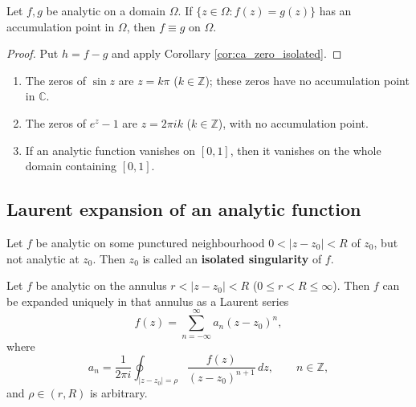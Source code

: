 \begin{corollary}\label{cor:ca_identity_theorem}
Let $f, g$ be analytic on a domain $\Omega$. If $\{z \in \Omega : f(z) = g(z)\}$ has an accumulation point in $\Omega$, then $f \equiv g$ on $\Omega$.
\end{corollary}

\begin{proof}
Put $h = f - g$ and apply Corollary \ref{cor:ca_zero_isolated}.
\end{proof}

\begin{example}\label{ex:ca_zero_isolated_application}
\begin{enumerate}[label=(\roman*)]
    \item The zeros of $\sin z$ are $z = k\pi$ ($k \in \mathbb{Z}$); these zeros have no accumulation point in $\mathbb{C}$.
    \item The zeros of $e^z - 1$ are $z = 2\pi i k$ ($k \in \mathbb{Z}$), with no accumulation point.
    \item If an analytic function vanishes on $[0, 1]$, then it vanishes on the whole domain containing $[0, 1]$.
\end{enumerate}
\end{example}

\subsection{Laurent expansion of an analytic function}

\begin{definition}\label{def:ca_isolated_singularity}
Let $f$ be analytic on some punctured neighbourhood $0 < |z - z_0| < R$ of $z_0$, but not analytic at $z_0$. Then $z_0$ is called an \textbf{isolated singularity} of $f$.
\end{definition}

\begin{theorem}\label{thm:ca_laurent_expansion}
Let $f$ be analytic on the annulus $r < |z - z_0| < R$ ($0 \le r < R \le \infty$). Then $f$ can be expanded uniquely in that annulus as a Laurent series
\[
f(z) = \sum_{n=-\infty}^{\infty} a_n (z - z_0)^n,
\]
where
\[
a_n = \frac{1}{2\pi i} \oint_{|z - z_0| = \rho} \frac{f(z)}{(z - z_0)^{n+1}} \, dz, \qquad n \in \mathbb{Z},
\]
and $\rho \in (r, R)$ is arbitrary.
\end{theorem}

